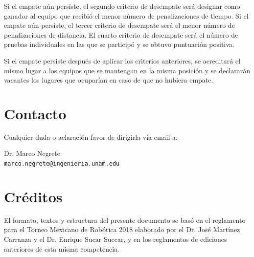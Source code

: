 \documentclass[letterpaper,12pt]{article}
\begin{document}
Si el empate aún persiste, el segundo criterio de desempate será designar como ganador al equipo que recibió el menor número de penalizaciones de tiempo. Si el empate aún persiste, el tercer criterio de desempate será el menor número de penalizaciones de distancia. El cuarto criterio de desempate será el número de pruebas individuales en las que se participó y se obtuvo puntuación positiva.

Si el empate persiste después de aplicar los criterios anteriores, se acreditará el mismo lugar a los equipos que se mantengan en la misma posición y se declararán vacantes los lugares que ocuparían en caso de que no hubiera empate.

\section{Contacto}
Cualquier duda o aclaración favor de dirigirla vía email a:

Dr. Marco Negrete\\ \texttt{marco.negrete@ingenieria.unam.edu}


\section*{Créditos}
El formato, textos y estructura del presente documento se basó en el reglamento para el Torneo Mexicano de Robótica 2018 elaborado por el Dr. José Martínez Carranza y el Dr. Enrique Sucar Succar, y en los reglamentos de ediciones anteriores de esta misma competencia. 
\end{document}
